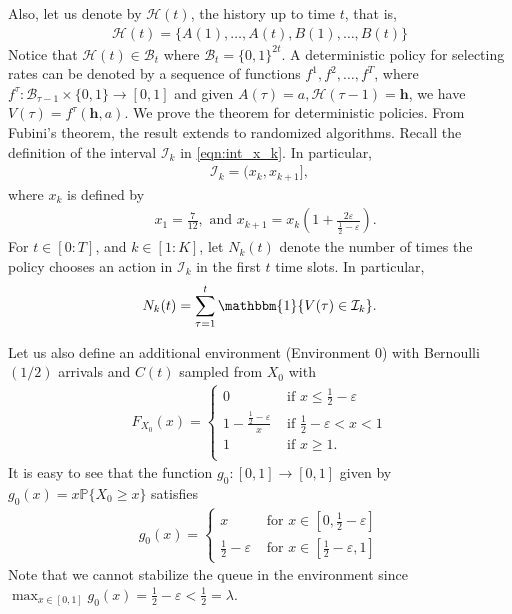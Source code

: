 \documentclass[12pt,draftcls, onecolumn]{IEEEtran}
\renewcommand{\vec}[1]{\ensuremath{\boldsymbol{#1}}}
\begin{document}
{Also, let us denote by $\mathcal{H}(t)$, the history up to time $t$, that is,
\begin{align}
    \mathcal{H}(t) = \{A(1), \dots, A(t),B(1),\dots, B(t)\} \nonumber
\end{align} 
Notice that $\mathcal{H}(t) \in \mathcal{B}_t$ where $\mathcal{B}_t = \{0,1\}^{2t}$. A deterministic policy for selecting rates can be denoted by a sequence of functions $f^{1}, f^2,\dots,f^T$, where $f^{\tau}:\mathcal{B}_{\tau-1} \times \{0,1\} \to [0,1]$ and given $ A(\tau) = a,\mathcal{H}(\tau-1) = \vec{h}$, we have $V(\tau) = f^{\tau}(\vec{h},a)$. We prove the theorem for deterministic policies. From Fubini's theorem, the result extends to randomized algorithms. Recall the definition of the interval $\mathcal{I}_k$ in \eqref{eqn:int_x_k}. In particular,
\begin{align}
    \mathcal{I}_k = (x_k,x_{k+1}],
\end{align}
where $x_k$ is defined by
\begin{align}
    &x_1 = \frac{7}{12}, \text{ and }x_{k+1} = x_k\left(1+ \frac{2\varepsilon}{\frac{1}{2}-\varepsilon}\right).
\end{align}
For $t \in [0:T]$, and $k \in [1:K]$, let $N_k(t)$ denote the number of times the policy chooses an action in $\mathcal{I}_k$ in the first $t$ time slots. In particular,
\begin{align}
    N_k(t) = \sum_{\tau = 1}^t \mathbbm{1}\{V(\tau) \in \mathcal{I}_k\}. \nonumber
\end{align}

Let us also define an additional environment (Environment 0) with Bernoulli$(1/2)$ arrivals and $C(t)$ sampled from $X_0$ with
\begin{align}
    F_{X_0}(x) = \begin{cases}
        0 & \text{ if } x \leq \frac{1}{2} - \varepsilon\\
        1 - \frac{\frac{1}{2}-\varepsilon}{x} & \text{ if }\frac{1}{2} - \varepsilon < x < 1\\
         1 & \text{ if }x \geq 1.\\
    \end{cases} \nonumber
\end{align}
It is easy to see that the function $g_0 :[0,1] \to [0,1]$ given by $g_0(x) = x\mathbb{P}\{X_0 \geq x\}$ satisfies
\begin{align}
    g_0(x) = \begin{cases}
        x & \text{ for } x \in \left[0,\frac{1}{2}-\varepsilon\right]\\
        \frac{1}{2} - \varepsilon & \text{ for } x \in \left[\frac{1}{2}-\varepsilon,1\right]
    \end{cases} \nonumber
\end{align}
Note that we cannot stabilize the queue in the environment since $\max_{x \in [0,1]} g_0(x) = \frac{1}{2} - \varepsilon < \frac{1}{2} = \lambda$. 

}
\end{document}
